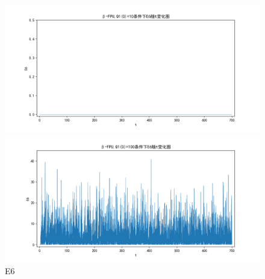 \documentclass[10pt, a4paper]{article}
\begin{document}
    \begin{figure}[H]
        \begin{minipage}[t]{0.49\textwidth}
            \centering
            \includegraphics[width=\textwidth]{./q6_pics/cmp/E6.png}
        \end{minipage}
        \begin{minipage}[t]{0.49\textwidth}
            \centering
            \includegraphics[width=\textwidth]{./q6_pics/exp/E6.png}
        \end{minipage}
        \caption{E6}\label{fig:E6 in q6}
    \end{figure}
\end{document}
